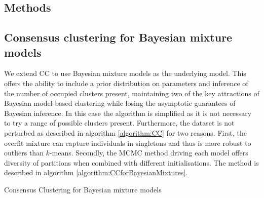 \documentclass{bioinfo}
\begin{document}

\begin{methods}
\section{Methods}

\subsection{Consensus clustering for Bayesian mixture models}
We extend CC to use Bayesian mixture models as the underlying model. This offers the ability to include a prior distribution on parameters and inference of the number of occupied clusters present, maintaining two of the key attractions of Bayesian model-based clustering while losing the asymptotic guarantees of Bayesian inference. In this case the algorithm is simplified as it is not necessary to try a range of possible clusters present. Furthermore, the dataset is not perturbed as described in algorithm \ref{algorithm:CC} for two reasons. First, the overfit mixture can capture individuals in singletons and thus is more robust to outliers than $k$-means. Secondly, the MCMC method driving each model offers diversity of partitions when combined with different initialisations. The method is described in algorithm \ref{algorithm:CCforBayesianMixtures}.

\begin{algorithm} \label{algorithm:CCforBayesianMixtures}
	\caption{Consensus Clustering for Bayesian mixture models}
\end{algorithm}





\end{methods}
\end{document}
